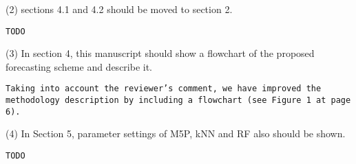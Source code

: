\documentclass[preprint]{elsarticle}
\begin{document}
\noindent (2) sections 4.1 and 4.2 should be moved to section 2.\\

\begin{verbatim}
TODO
\end{verbatim}


\noindent (3) In section 4, this manuscript should show a flowchart of the proposed forecasting scheme and describe it.\\

\begin{verbatim}
Taking into account the reviewer’s comment, we have improved the methodology description by including a flowchart (see Figure 1 at page 6).
\end{verbatim}


\noindent (4) In Section 5, parameter settings of M5P, kNN and RF also should be shown.

\begin{verbatim}
TODO
\end{verbatim}
\end{document}
